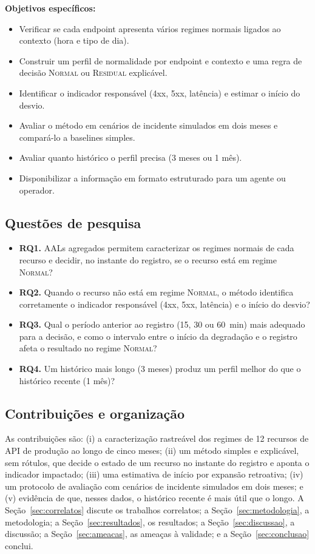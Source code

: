 \documentclass[sigconf,nonacm]{acmart}
\newcommand{\Normal}{\textsc{Normal}\xspace}
\newcommand{\Residual}{\textsc{Residual}\xspace}
\begin{document}
\textbf{Objetivos específicos:}
\begin{itemize}
  \item Verificar se cada endpoint apresenta vários regimes normais ligados ao contexto (hora e tipo de dia).
  \item Construir um perfil de normalidade por endpoint e contexto e uma regra de decisão \Normal ou \Residual explicável.
  \item Identificar o indicador responsável (4xx, 5xx, latência) e estimar o início do desvio.
  \item Avaliar o método em cenários de incidente simulados em dois meses e compará-lo a baselines simples.
  \item Avaliar quanto histórico o perfil precisa (3 meses ou 1 mês).
  \item Disponibilizar a informação em formato estruturado para um agente ou operador.
\end{itemize}

\subsection{Questões de pesquisa}
\begin{itemize}
  \item \textbf{RQ1.} AALs agregados permitem caracterizar os regimes normais de cada recurso e decidir, no instante do registro, se o recurso está em regime \Normal?
  \item \textbf{RQ2.} Quando o recurso não está em regime \Normal, o método identifica corretamente o indicador responsável (4xx, 5xx, latência) e o início do desvio?
  \item \textbf{RQ3.} Qual o período anterior ao registro (15, 30 ou 60~min) mais adequado para a decisão, e como o intervalo entre o início da degradação e o registro afeta o resultado no regime \Normal?
  \item \textbf{RQ4.} Um histórico mais longo (3 meses) produz um perfil melhor do que o histórico recente (1 mês)?
\end{itemize}

\subsection{Contribuições e organização}
As contribuições são: (i) a caracterização rastreável dos regimes de 12 recursos de API de produção ao longo de cinco meses; (ii) um método simples e explicável, sem rótulos, que decide o estado de um recurso no instante do registro e aponta o indicador impactado; (iii) uma estimativa de início por expansão retroativa; (iv) um protocolo de avaliação com cenários de incidente simulados em dois meses; e (v) evidência de que, nesses dados, o histórico recente é mais útil que o longo. A Seção~\ref{sec:correlatos} discute os trabalhos correlatos; a Seção~\ref{sec:metodologia}, a metodologia; a Seção~\ref{sec:resultados}, os resultados; a Seção~\ref{sec:discussao}, a discussão; a Seção~\ref{sec:ameacas}, as ameaças à validade; e a Seção~\ref{sec:conclusao} conclui.
\end{document}
